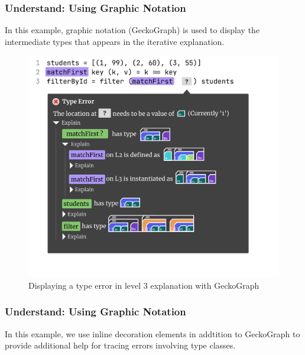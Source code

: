 \subsubsection{Understand: Using Graphic Notation}

In this example, graphic notation (GeckoGraph) is used to display the intermediate types that appears in the iterative explanation. 

\begin{figure}[hbt]
    \includegraphics[width=\linewidth]{Debugging-3-Gecko}
    \caption{
        Displaying a type error in level 3 explanation with GeckoGraph
      }
  \end{figure}


\subsubsection{Understand: Using Graphic Notation}

  In this example, we use inline decoration elements in addtition to GeckoGraph to provide additional help for tracing errors involving type classes.  

